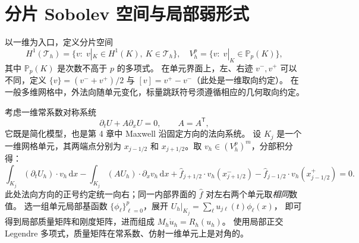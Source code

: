 \documentclass[UTF8,11pt,openany]{ctexbook}
\numberwithin{equation}{chapter}
\theoremstyle{definition}
\theoremstyle{remark}
\newcommand{\dd}{\mathrm d}
\begin{document}
\section{分片 Sobolev 空间与局部弱形式}\label{sec:broken}
以一维为入口，定义分片空间
\begin{equation}
H^1(\mathcal T_h)=\{v:\;v|_K\in H^1(K),\ K\in\mathcal T_h\},
\quad
V_h^p=\{v:\;v|_K\in\mathbb P_p(K)\},
\end{equation}
其中 $\mathbb P_p(K)$ 是次数不高于 $p$ 的多项式。
在单元界面上，左、右迹 $v^-,v^+$ 可以不同，定义
$\{v\}=(v^-+v^+)/2$ 与 $[v]=v^+-v^-$（此处是一维取向约定）。
在一般多维网格中，外法向随单元变化，标量跳跃符号须遵循相应的几何取向约定。

考虑一维常系数对称系统
\begin{equation}\label{eq:dgmodel}
\partial_tU+A\partial_xU=0,\qquad A=A^\mathsf T,
\end{equation}
它既是简化模型，也是第 4 章中 Maxwell 沿固定方向的法向系统。
设 $K_j$ 是一个一维网格单元，其两端点分别为
$x_{j-1/2}$ 和 $x_{j+1/2}$。取 $v_h\in(V_h^p)^m$，分部积分得：
\begin{equation}\label{eq:dgweak}
\int_{K_j}(\partial_tU_h)\cdot v_h\,\dd x
-\int_{K_j}(AU_h)\cdot\partial_xv_h\,\dd x
+\widehat f_{j+1/2}\cdot v_h(x_{j+1/2}^-)
-\widehat f_{j-1/2}\cdot v_h(x_{j-1/2}^+)=0.
\end{equation}
此处法向方向的正号约定统一向右；同一内部界面的
$\widehat f$ 对左右两个单元取\emph{相同}数值。
选一组单元局部基函数 $\{\phi_\ell\}_{\ell=0}^p$，展开
$U_h|_{K_j}=\sum_\ell u_{j\ell}(t)\phi_\ell(x)$，
即可得到局部质量矩阵和刚度矩阵，进而组成
$M_h\dot u_h=R_h(u_h)$。
使用局部正交 Legendre 多项式，质量矩阵在常系数、仿射一维单元上是对角的。
\end{document}
